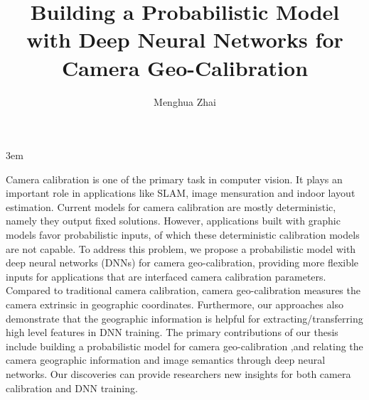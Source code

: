 \documentclass[final]{ukthesis}
\begin{document}
\emergencystretch 3em

\author{Menghua Zhai}
\title{Building a Probabilistic Model with Deep Neural Networks for Camera Geo-Calibration}

\abstract
{ \SingleSpacing
Camera calibration is one of the primary task in computer vision.
It plays an important role in applications like SLAM, image
mensuration and indoor layout estimation. Current models for camera
calibration are mostly deterministic, namely they output fixed
solutions. However, applications built with graphic models favor
probabilistic inputs, of which these deterministic calibration
models are not capable.
To address this problem, we propose a probabilistic model with deep
neural networks (DNNs) for camera
geo-calibration, providing more flexible inputs for applications that
are interfaced camera calibration parameters. Compared to 
traditional camera calibration, camera geo-calibration measures the
camera extrinsic in geographic coordinates.
Furthermore, our approaches also demonstrate that the geographic
information is helpful for extracting/transferring high level
features in DNN training.
The primary contributions of our thesis include building a
probabilistic model for camera geo-calibration ,and relating the
camera geographic information and image semantics through deep neural
networks. Our discoveries can provide researchers new insights for
both camera calibration and DNN training.
}


\frontmatter
\maketitle



\tableofcontents\clearpage

\mainmatter




\backmatter




\end{document}
